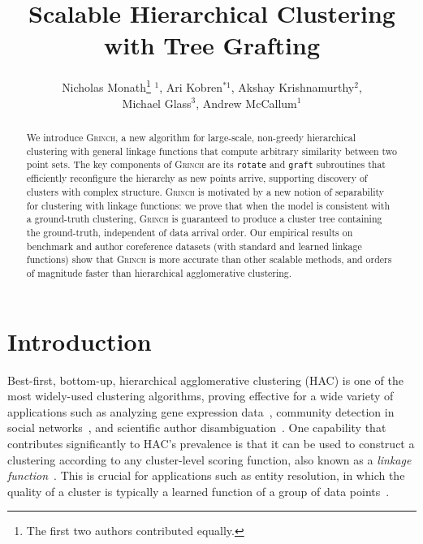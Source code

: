 \documentclass{article} \usepackage[utf8]{inputenc} \usepackage[T1]{fontenc}    \usepackage{hyperref}       \usepackage{url}            \usepackage{booktabs}       \usepackage{amsfonts}       \usepackage{nicefrac}       \usepackage{microtype}      \usepackage{geometry}
\newcommand{\alg}{\textsc{Grinch}\xspace}
\newcommand{\records}{data points\xspace}
\newcommand{\hac}{\textsc{HAC}\xspace}
\newcommand{\graft}{\texttt{graft}\xspace}
\newcommand{\rotate}{\texttt{rotate}\xspace}
\newcommand{\hof}{linkage function\xspace}
\newcommand{\hofs}{linkage functions\xspace}
\begin{document}
\title{Scalable Hierarchical Clustering with Tree Grafting}
\author{Nicholas Monath\thanks{The first two authors contributed
    equally.} $^1$, Ari Kobren$^{*1}$, Akshay Krishnamurthy$^2$, \\Michael
  Glass$^3$, Andrew McCallum$^1$}



\maketitle

\begin{abstract}
  We introduce \alg, a new algorithm for large-scale, non-greedy
  hierarchical clustering with general linkage functions that compute arbitrary similarity between two point
  sets.  The key components of \alg are its \rotate and \graft subroutines
  that efficiently reconfigure the hierarchy as new points arrive,
  supporting discovery of clusters with complex structure.  \alg
  is motivated by a new notion of separability for clustering with
  \hofs: we prove that when the model is consistent with a
  ground-truth clustering, \alg is guaranteed to produce a cluster
  tree containing the ground-truth, independent of data arrival order.
  Our empirical results on benchmark and author coreference datasets
  (with standard and learned \hofs) show that \alg is more accurate
  than other scalable methods, and orders of magnitude faster than
  hierarchical agglomerative clustering.
\end{abstract} \section{Introduction}
\label{sec:intro}
Best-first, bottom-up, hierarchical agglomerative clustering (\hac) is
one of the most widely-used clustering algorithms, proving effective
for a wide variety of applications such as analyzing gene expression
data~\cite{eisen1998cluster}, community detection in social
networks~\cite{blundell2013bayesian}, and scientific author
disambiguation~\cite{culotta2007author}. One capability that
contributes significantly to \hac's prevalence is that it can be used
to construct a clustering according to any cluster-level scoring
function, also known as a \emph{\hof}~\cite{kohli2009robust,
  lee2012joint}. This is crucial for applications such as entity
resolution, in which the quality of a cluster is typically a learned
function of a group of \records~\cite{culotta2007author,
  singh2011large, wick2012discriminative}.
\end{document}
